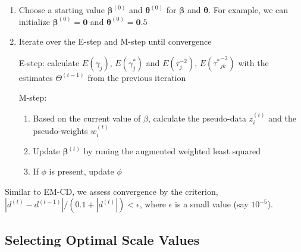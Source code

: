 \documentclass[AMA,STIX1COL,]{WileyNJD-v2}
\providecommand{\tightlist}{%
  \setlength{\itemsep}{0pt}\setlength{\parskip}{0pt}}
\begin{document}
\begin{enumerate}
\def\labelenumi{\arabic{enumi})}
\item
  Choose a starting value \(\boldsymbol{\beta}^{(0)}\) and
  \(\boldsymbol{\theta}^{(0)}\) for \(\boldsymbol{\beta}\) and
  \(\boldsymbol{\theta}\). For example, we can initialize
  \(\boldsymbol{\beta}^{(0)} = \boldsymbol{0}\) and
  \(\boldsymbol{\theta}^{(0)} = \boldsymbol{0}.5\)
\item
  Iterate over the E-step and M-step until convergence

  E-step: calculate \(E(\gamma_{j})\), \(E(\gamma^*_{j})\) and
  \(E(\tau^{-2}_{j})\), \(E({\tau^*}^{-2}_{jk})\) with the estimates
  \(\Theta^{(t-1)}\) from the previous iteration

  M-step:

  \begin{enumerate}
  \def\labelenumii{\alph{enumii})}
  \tightlist
  \item
    Based on the current value of \(\beta\), calculate the pseudo-data
    \(z_i^{(t)}\) and the pseudo-weights \(w_i^{(t)}\)
  \item
    Update \(\boldsymbol{\beta}^{(t)}\) by runing the augmented weighted
    least squared
  \item
    If \(\phi\) is present, update \(\phi\)
  \end{enumerate}
\end{enumerate}

Similar to EM-CD, we assess convergence by the criterion,
\(|d^{(t)}-d^{(t-1)}|/(0.1+|d^{(t)}|)<\epsilon\), where \(\epsilon\) is
a small value (say \(10^{-5}\)).

\hypertarget{selecting-optimal-scale-values}{%
\subsection{Selecting Optimal Scale
Values}\label{selecting-optimal-scale-values}}
\end{document}
